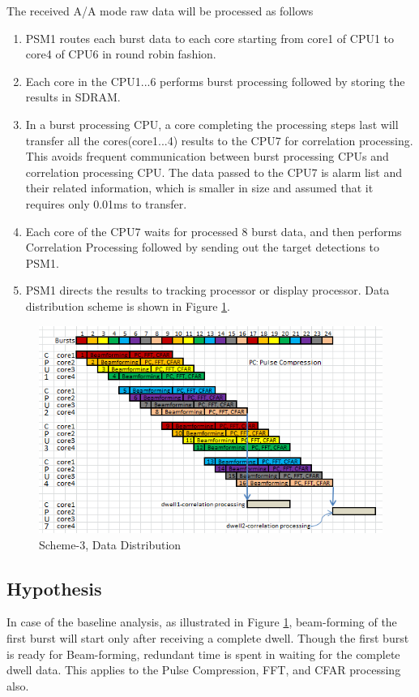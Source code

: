\vspace*{0.2cm}
\noindent
The received A/A mode raw data will be processed as follows

\begin{enumerate}
\item PSM1 routes each burst data to each core starting from core1 of CPU1 to core4 of CPU6 in round robin fashion.
\item Each core in the CPU1...6 performs burst processing followed by storing the results in SDRAM.
\item In a burst processing CPU, a core completing the processing steps last will transfer all the cores(core1...4) results to the CPU7 for correlation processing. This avoids frequent communication between burst processing CPUs and correlation processing CPU. The data passed to the CPU7 is alarm list and their related information, which is smaller in size and assumed that it requires only 0.01ms to transfer.
\item Each core of the CPU7 waits for processed 8 burst data, and then performs Correlation Processing followed by sending out the target detections to PSM1.
\item PSM1 directs the results to tracking processor or display processor. Data distribution scheme is shown in Figure \ref{fig:mm:scheme4_data_distribution}.
\end{enumerate}

\begin{figure}[h!]
	\centering
	\includegraphics[width=140mm]{figures/scheme4_data_distribution.png}
	\caption{Scheme-3, Data Distribution}
	\label{fig:mm:scheme4_data_distribution}
\end{figure}

\subsection{Hypothesis}
In case of the baseline analysis, as illustrated in Figure \ref{fig:mm:scheme4_data_distribution}, beam-forming of the first burst will start only after receiving a complete dwell. Though the first burst is ready for Beam-forming, redundant time is spent in waiting for the complete dwell data. This applies to the Pulse Compression, FFT, and CFAR processing also.


